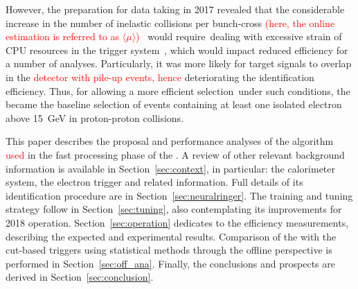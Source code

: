 However, the preparation for data taking in 2017 revealed that the considerable increase in the number of inelastic collisions per bunch-cross \textcolor{red}{(here, the online estimation is referred to as $\langle \mu \rangle$)}~\cite{DAPR-2013-01} would require dealing with excessive strain of CPU resources in the trigger system~\cite{ATL-DAQ-PUB-2018-002}, which would impact reduced efficiency for a number of analyses. Particularly, it was more likely for target  signals to overlap in the \textcolor{red}{detector with pile-up events, hence} deteriorating the identification efficiency. Thus, for allowing a more efficient selection under such conditions, the \rnn{} became the baseline selection of events containing at least one isolated electron above \SI{15}{\GeV} in proton-proton collisions.




This paper describes the proposal and performance analyses of the \rnn{}
algorithm \textcolor{red}{used} in the fast processing phase of the \hlt{}. A review
of other relevant background information is available in
Section~\ref{sec:context}, in particular: the calorimeter system, the electron
trigger and related information. Full details of its identification procedure are
in Section~\ref{sec:neuralringer}. The training and tuning strategy follow in
Section~\ref{sec:tuning}, also contemplating its improvements for 2018
operation. Section~\ref{sec:operation} dedicates to the efficiency measurements,
describing the expected and experimental results. Comparison of the \rnn with
the cut-based triggers using statistical methods through the offline perspective
is performed in Section~\ref{sec:off_ana}. %
Finally, the conclusions and prospects are derived in Section~\ref{sec:conclusion}.


